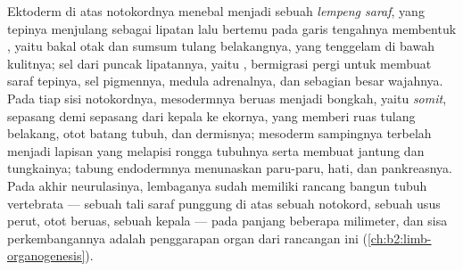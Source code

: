 \begin{proposition}\label{prop:b2:vertebrate-development:neurulation}
Ektoderm di atas notokordnya menebal menjadi sebuah \emph{lempeng
saraf}, yang tepinya menjulang sebagai lipatan lalu bertemu pada garis
tengahnya membentuk \emph{}, yaitu bakal otak dan sumsum
tulang belakangnya, yang tenggelam di bawah kulitnya; sel dari puncak
lipatannya, yaitu \emph{}, bermigrasi pergi untuk membuat
saraf tepinya, sel pigmennya, medula adrenalnya, dan sebagian besar
wajahnya. Pada tiap sisi notokordnya, mesodermnya beruas menjadi
bongkah, yaitu \emph{somit}, sepasang demi sepasang dari kepala ke
ekornya, yang memberi ruas tulang belakang, otot batang tubuh, dan
dermisnya; mesoderm sampingnya terbelah menjadi lapisan yang melapisi
rongga tubuhnya serta membuat jantung dan tungkainya; tabung endodermnya
menunaskan paru-paru, hati, dan pankreasnya. Pada akhir neurulasinya,
lembaganya sudah memiliki rancang bangun tubuh vertebrata --- sebuah
tali saraf punggung di atas sebuah notokord, sebuah usus perut, otot
beruas, sebuah kepala --- pada panjang beberapa milimeter, dan sisa
perkembangannya adalah penggarapan organ dari rancangan ini
(\cref{ch:b2:limb-organogenesis}).
\end{proposition}


